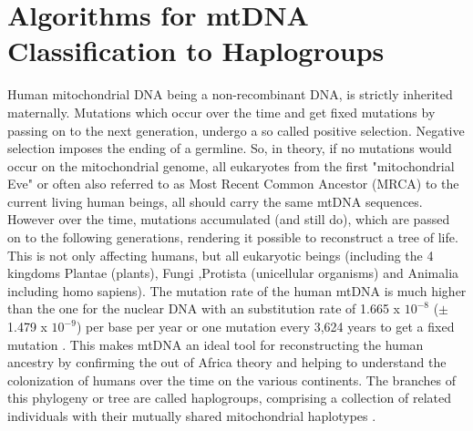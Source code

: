 \chapter{Algorithms for mtDNA Classification to Haplogroups}
\label{chapterHaplogrep}
Human mitochondrial DNA being a non-recombinant DNA, is strictly inherited maternally. Mutations which occur over the time and get fixed mutations by passing on to the next generation, undergo a so called positive selection. Negative selection imposes the ending of a germline. So, in theory, if no mutations would occur on the mitochondrial genome, all eukaryotes from the first "mitochondrial Eve" or often also referred to as Most Recent Common Ancestor (MRCA) to the current living human beings, all should carry the same mtDNA sequences. However over the time, mutations accumulated (and still do), which are passed on to the following generations, rendering it possible to reconstruct a tree of life. This is not only affecting humans, but all eukaryotic beings (including the 4 kingdoms Plantae (plants), Fungi ,Protista (unicellular organisms) and Animalia including homo sapiens). The mutation rate of the human mtDNA is much higher than the one for the nuclear DNA with an substitution rate of 1.665 x $10^{-8}$ ($\pm$ 1.479 x $10^{-9}$) per base per year or one mutation every 3,624 years to get a fixed mutation \cite{Soares2009}. This makes mtDNA an ideal tool for reconstructing the human ancestry by confirming the out of Africa theory and helping to understand the colonization of humans over the time on the various continents. The branches of this phylogeny or tree are called haplogroups, comprising a collection of related individuals with their mutually shared mitochondrial haplotypes \cite{Scally2012}. \\
